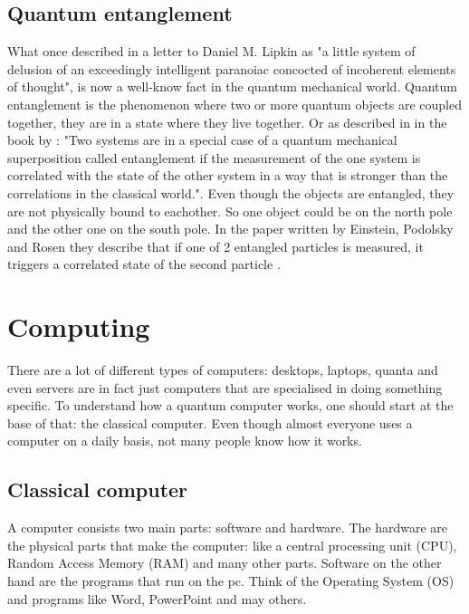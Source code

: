 \subsection{Quantum entanglement} \label{quantum entanglement}
What \textcite{Einstein} once described in a letter to Daniel M. Lipkin as "a little system of delusion of an exceedingly intelligent paranoiac concocted of incoherent elements of thought", is now a well-know fact in the quantum mechanical world.
Quantum entanglement is the phenomenon where two or more quantum objects are coupled together, they are in a state where they live together.
Or as described in in the book by \textcite{Hidary_2019}: "Two systems are in a special case of a quantum mechanical superposition called entanglement if the measurement of the one system is correlated with the state of the other system in a way that is stronger than the correlations in the classical world.".
Even though the objects are entangled, they are not physically bound to eachother. So one object could be on the north pole and the other one on the south pole.
In the paper written by Einstein, Podolsky and Rosen they describe that if one of 2 entangled particles is measured, it triggers a correlated state of the second particle \autocite{EPR}.


\section{Computing} \label{computing}
There are a lot of different types of computers: desktops, laptops, quanta and even servers are in fact just computers that are specialised in doing something specific.
To understand how a quantum computer works, one should start at the base of that: the classical computer. Even though almost everyone uses a computer on a daily basis, not many people know how it works.


\subsection{Classical computer} \label{classical computer}
A computer consists two main parts: software and hardware. The hardware are the physical parts that make the computer: like a central processing unit (CPU), Random Access Memory (RAM) and many other parts.
Software on the other hand are the programs that run on the pc. Think of the Operating System (OS) and programs like Word, PowerPoint and may others.


